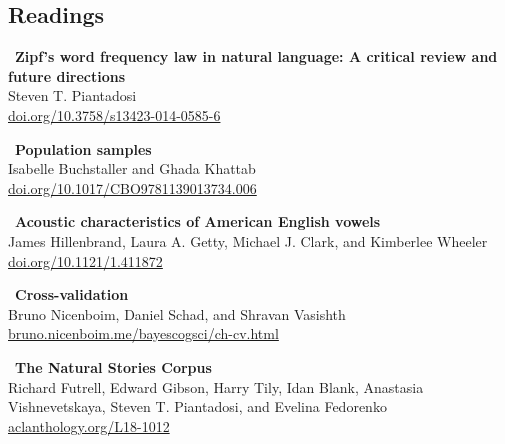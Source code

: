 \documentclass[11pt,letterpaper]{article}
\begin{document}
\subsection{Readings}

\begin{tcolorbox}[colback=white,colframe=accentblue,boxrule=0.5pt,arc=2mm]
\faBook\ \textbf{Zipf's word frequency law in natural language: A critical review and future directions}\\
\phantom{\faBook\ }Steven T. Piantadosi\\
\phantom{\faBook\ }\href{https://doi.org/10.3758/s13423-014-0585-6}{doi.org/10.3758/s13423-014-0585-6}
\end{tcolorbox}

\begin{tcolorbox}[colback=white,colframe=accentblue,boxrule=0.5pt,arc=2mm]
\faBook\ \textbf{Population samples}\\
\phantom{\faBook\ }Isabelle Buchstaller and Ghada Khattab\\
\phantom{\faBook\ }\href{https://doi.org/10.1017/CBO9781139013734.006}{doi.org/10.1017/CBO9781139013734.006}
\end{tcolorbox}

\begin{tcolorbox}[colback=white,colframe=accentblue,boxrule=0.5pt,arc=2mm]
\faBook\ \textbf{Acoustic characteristics of American English vowels}\\
\phantom{\faBook\ }James Hillenbrand, Laura A. Getty, Michael J. Clark, and Kimberlee Wheeler\\
\phantom{\faBook\ }\href{https://doi.org/10.1121/1.411872}{doi.org/10.1121/1.411872}
\end{tcolorbox}

\begin{tcolorbox}[colback=white,colframe=accentblue,boxrule=0.5pt,arc=2mm]
\faBook\ \textbf{Cross-validation}\\
\phantom{\faBook\ }Bruno Nicenboim, Daniel Schad, and Shravan Vasishth\\
\phantom{\faBook\ }\href{https://bruno.nicenboim.me/bayescogsci/ch-cv.html}{bruno.nicenboim.me/bayescogsci/ch-cv.html}
\end{tcolorbox}

\begin{tcolorbox}[colback=white,colframe=accentblue,boxrule=0.5pt,arc=2mm]
\faBook\ \textbf{The Natural Stories Corpus}\\
\phantom{\faBook\ }Richard Futrell, Edward Gibson, Harry Tily, Idan Blank, Anastasia Vishnevetskaya, Steven T. Piantadosi, and Evelina Fedorenko\\
\phantom{\faBook\ }\href{https://aclanthology.org/L18-1012/}{aclanthology.org/L18-1012}
\end{tcolorbox}
\end{document}
